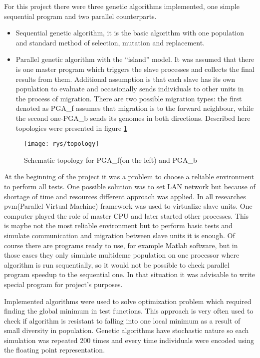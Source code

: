 For this project there were three genetic algorithms implemented, one simple
sequential program and two parallel counterparts. 
\begin{itemize}
	\item Sequential genetic algorithm, it is the basic algorithm with one
		population and standard method of selection, mutation and replacement.
	\item Parallel genetic algorithm with the ``island'' model. It was assumed
		that there is one master program which triggers the slave processes and
		collects the final results from them.
		Additional assumption is that each slave has its own population to
		evaluate and occasionally sends individuals to other units in the process
		of migration. There are two possible migration types: the first denoted
		as PGA\_f assumes that migration is to the forward neighbour, while the
		second one-PGA\_b sends its genomes in both directions. Described here
		topologies were presented in figure \ref{fig:topology}
\end{itemize}
\begin{figure}[!htpb]
	\begin{center}
		\texttt{[image: rys/topology]}
	\end{center}
	\caption{Schematic topology for PGA\_f(on the left) and PGA\_b}
	\label{fig:topology}
\end{figure}
At the beginning of the project it was a problem to choose a reliable environment
to perform all tests. One possible solution was to set LAN network but because
of shortage of time and resources different approach was applied. In all researches
pvm(Parallel Virtual Machine) framework was used to virtualize slave units. One 
computer played the role of master CPU and later started other processes. This is 
maybe not the most reliable environment but to perform basic tests and simulate
communication and migration between slave units it is enough. Of course there 
are programs ready to use, for
example Matlab software, but in those cases they only simulate multideme population
on one processor where algorithm is run sequentially, so it would
not be possible to check parallel program speedup to the sequential one.
In that situation it was advisable to write special program for project's purposes.


Implemented algorithms were used to solve optimization problem which required
finding the global minimum in test functions. This approach is very often used
to check if algorithm is resistant to falling into one local minimum as a result
of small diversity in population. Genetic algorithms have stochastic nature so each
simulation was repeated 200 times and every time individuals were encoded using
the floating point representation.


